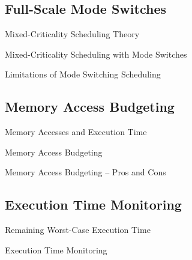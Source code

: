 \subsection{Full-Scale Mode Switches}

\begin{frame}{Mixed-Criticality Scheduling Theory}

\end{frame}

\begin{frame}{Mixed-Criticality Scheduling with Mode Switches}

\end{frame}

\begin{frame}{Limitations of Mode Switching Scheduling}

\end{frame}


\subsection{Memory Access Budgeting}

\begin{frame}{Memory Accesses and Execution Time}

\end{frame}

\begin{frame}{Memory Access Budgeting}

\end{frame}


\begin{frame}{Memory Access Budgeting -- Pros and Cons}

\end{frame}

\subsection{Execution Time Monitoring}

\begin{frame}{Remaining Worst-Case Execution Time}

\end{frame}

\begin{frame}{Execution Time Monitoring}

\end{frame}


